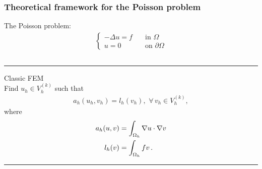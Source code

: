 \begin{frame}[t]
    \frametitle{Theoretical framework for the Poisson problem} The Poisson problem:
    \Large 
    \begin{align} 
        \begin{cases}
            -\Delta u = f  &\quad \text{in } \Omega \\
            u = 0  &\quad \text{on } \partial\Omega 
        \end{cases}
        \label{eq:poisson}
    \end{align}
    \normalsize
    \pause
\begin{columns}[T] %
    \begin{column}{.46\textwidth}
        \color{purple}\rule{\linewidth}{4pt}
        Classic FEM
        \color{black} \\ \footnotesize \vspace*{1pt}
        Find $u_h \in V_h^{(k)}$ such that
        \begin{align*}
            a_h(u_h,v_h)=l_h(v_h), \,\, \forall \, v_h \in V_h^{(k)},
        \end{align*}
        where
        \begin{align*}
            \notag
            a_h(u,v) & = \int_{\Omega_h} \nabla u \cdot \nabla v \\
            l_h(v) &= \int_{\Omega_h} fv \,.
            \label{eq:PoissonClassic}
        \end{align*}
        \hrule
    \end{column}%

    \hfill%
    
    \normalsize


\end{columns}
\end{frame}
